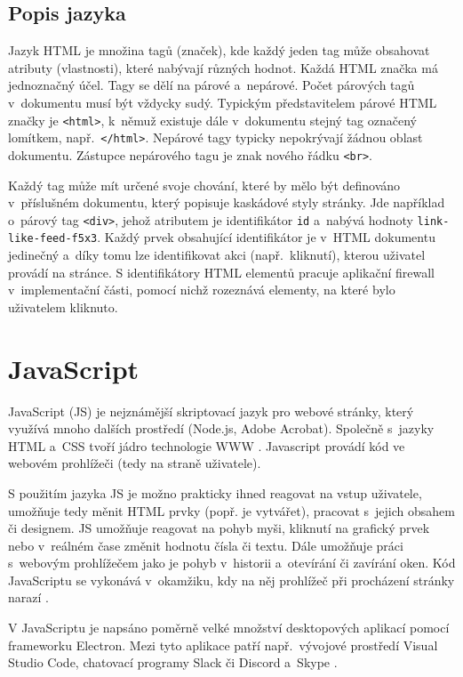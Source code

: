 \subsection*{Popis jazyka}
Jazyk HTML je množina tagů (značek), kde každý jeden tag může obsahovat atributy (vlastnosti), které nabývají různých hodnot. Každá HTML značka má jednoznačný účel. Tagy se dělí na párové a~nepárové. Počet párových tagů v~dokumentu musí být vždycky sudý. Typickým představitelem párové HTML značky je \texttt{<html>}, k~němuž existuje dále v~dokumentu stejný tag označený lomítkem, např.~\texttt{</html>}. Nepárové tagy typicky nepokrývají žádnou oblast dokumentu. Zástupce nepárového tagu je znak nového řádku \texttt{<br>}.

Každý tag může mít určené svoje chování, které by mělo být definováno v~příslušném dokumentu, který popisuje kaskádové styly stránky. Jde například o~párový tag \texttt{<div>}, jehož atributem je identifikátor \texttt{id} a~nabývá hodnoty \texttt{link-like-feed-f5x3}. Každý prvek obsahující identifikátor je v~HTML dokumentu jedinečný a~díky tomu lze identifikovat akci (např.~kliknutí), kterou uživatel provádí na stránce. S identifikátory HTML elementů pracuje aplikační firewall v~implementační části, pomocí nichž rozeznává elementy, na které bylo uživatelem kliknuto.

\section{JavaScript}
\label{sec:java_script}
JavaScript (JS) je nejznámější skriptovací jazyk pro webové stránky, který využívá mnoho dalších prostředí (Node.js, Adobe Acrobat). Společně s~jazyky HTML a~CSS tvoří jádro technologie WWW \cite{bib:js_html_css}. Javascript provádí kód ve webovém prohlížeči (tedy na straně uživatele).

S použitím jazyka JS je možno prakticky ihned reagovat na vstup uživatele, umožňuje tedy měnit HTML prvky (popř. je vytvářet), pracovat s~jejich obsahem či designem. JS umožňuje reagovat na pohyb myši, kliknutí na grafický prvek nebo v~reálném čase změnit hodnotu čísla či textu. Dále umožňuje práci s~webovým prohlížečem jako je pohyb v~historii a~otevírání či zavírání oken. Kód JavaScriptu se vykonává v~okamžiku, kdy na něj prohlížeč při procházení stránky narazí \cite{bib:IIS_JS}.

V JavaScriptu je napsáno poměrně velké množství desktopových aplikací pomocí frameworku Electron. Mezi tyto aplikace patří např.~vývojové prostředí Visual Studio Code, chatovací programy Slack či Discord a~Skype \cite{bib:electron}.

